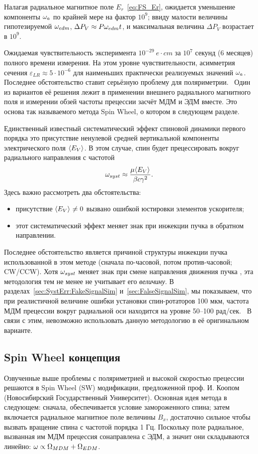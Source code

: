 \documentclass{report}
\begin{document}
Налагая радиальное магнитное поле $E_r$~\eqref{eq:FS_Er}, ожидается
уменьшение компоненты $\omega_a$ по крайней мере на фактор $10^9$; ввиду
малости величины гипотезируемой $\omega_{edm}$, $\Delta P_V \approx P
\omega_{edm} t$, и максимальная величина $\Delta P_V$ возрастает в $10^9$.

Ожидаемая чувствительность эксперимента $10^{-29}~e\cdot cm$ за $10^7$
секунд (6 месяцев) полного времени измерения. На этом уровне
чувствительности, асимметрия сечения $\varepsilon_{LR} \approx 5\cdot
10^{-6}$ для наименьших практически реализуемых значений
$\omega_a$.~\citep[стр.~18]{BNL:Deuteron2008} Последнее обстоятельство
ставит серьёзную проблему для поляриметрии.~\cite{Mane:SpinWheel} Один
из вариантов её решения лежит в применении внешнего радиального
магнитного поля и измерении обзей частоты прецессии засчёт МДМ и ЭДМ
вместе. Это основа так называемого метода Spin Wheel, о котором в
следующем разделе.

Единственный известный систематический эффект спиновой динамики
первого порядка это присутствие ненулевой средней вертикальной
компоненты электрического поля $\avg{E_V}$. В этом случае, спин будет
прецессировать вокруг радиального направления с частотой~\citep[стр.~11]{BNL:Deuteron2008}
\[
\w_{syst} \approx \frac{\mu\avg{E_V}}{\beta c\gamma^2}.
\]
Здесь важно рассмотреть два обстоятельства:
\begin{itemize}
\item присутствие $\avg{E_V}\neq 0$ вызвано ошибкой юстировки
  элементов ускорителя;
\item этот систематический эффект меняет знак при инжекции пучка в
  обратном направлении.
\end{itemize}
Последнее обстоятельство является причиной структуры инжекции пучка
использованной в этом методе (сначала по-часовой, потом
против-часовой; CW/CCW). Хотя $\omega_{syst}$ меняет знак при смене
направления движения пучка , эта методология тем не менее не учитывает
его \emph{величину}. В разделах~\ref{sec:SystErr:FakeSignalSim} и~\ref{sec:FalseSignalSim}, мы
показываем, что при реалистичной величине ошибки установки
спин-ротаторов 100 мкм, частота МДМ прецессии вокруг радиальной оси
находится на уровне 50--100 рад/сек.~\cite{Senichev:FDM} В связи с
этим, невозможно использовать данную методологию в её оригинальном варианте.

\subsection{Spin Wheel концепция}
Озвученные выше проблемы с поляриметрией и высокой скоростью прецессии
решаются в Spin Wheel (SW) модификации, предложенной проф. И. Коопом
(Новосибирский Государственный Университет). Основная идея метода в
следующем: сначала, обеспечивается условие замороженного спина; затем
включается радиальное магнитное поле величины $B_x$, достаточно сильное чтобы
вызвать вращение спина с частотой порядка 1 Гц. Поскольку поле
радиальное, вызванная им МДМ прецессия сонаправлена с ЭДМ, а значит
они складываются линейно: $\omega \propto \Omega_{MDM} + \Omega_{EDM}$.
\end{document}
